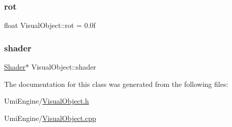 \subsubsection{\texorpdfstring{rot}{rot}}
{\footnotesize\ttfamily float Visual\+Object\+::rot = 0.\+0f}

\mbox{\label{class_visual_object_a6d00e06796983b19f57d6fd86b202902}} 
\subsubsection{\texorpdfstring{shader}{shader}}
{\footnotesize\ttfamily \mbox{\hyperlink{class_shader}{Shader}}$\ast$ Visual\+Object\+::shader}



The documentation for this class was generated from the following files\+:\begin{DoxyCompactItemize}
\item 
Umi\+Engine/\mbox{\hyperlink{_visual_object_8h}{Visual\+Object.\+h}}\item 
Umi\+Engine/\mbox{\hyperlink{_visual_object_8cpp}{Visual\+Object.\+cpp}}\end{DoxyCompactItemize}
